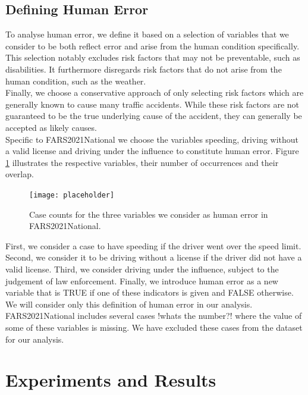 \documentclass{article}
\theoremstyle{plain}
\theoremstyle{definition}
\theoremstyle{remark}
\begin{document}
\subsection{Defining Human Error}
To analyse human error, we define it based on a selection of variables that we consider to be both reflect error and arise from the human condition specifically. This selection notably excludes risk factors that may not be preventable, such as disabilities. It furthermore disregards risk factors that do not arise from the human condition, such as the weather.\\
Finally, we choose a conservative approach of only selecting risk factors which are generally known to cause many traffic accidents. While these risk factors are not guaranteed to be the true underlying cause of the accident, they can generally be accepted as likely causes.
\\
Specific to FARS2021National we choose the variables speeding, driving without a valid license and driving under the influence to constitute human error. Figure \ref{fig:err-case-counts} illustrates the respective variables, their number of occurrences and their overlap.

\begin{figure}[ht]
	\vskip 0.2in
	\begin{center}
		\centerline{\texttt{[image: placeholder]}}
		\caption{Case counts for the three variables we consider as human error in FARS2021National.}
		\label{fig:err-case-counts}
	\end{center}
	\vskip -0.2in
\end{figure}

First, we consider a case to have speeding if the driver went over the speed limit. Second, we consider it to be driving without a license if the driver did not have a valid license. Third, we consider driving under the influence, subject to the judgement of law enforcement. Finally, we introduce human error as a new variable that is TRUE if one of these indicators is given and FALSE otherwise. We will consider only this definition of human error in our analysis.
\\
FARS2021National includes several cases !whats the number?! where the value of some of these variables is missing. We have excluded these cases from the dataset for our analysis.

\section{Experiments and Results}\label{sec:results}
\end{document}
